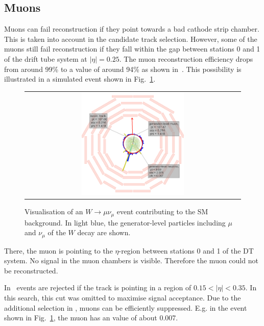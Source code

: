 \subsection*{Muons}
Muons can fail reconstruction if they point towards a bad cathode strip chamber.
This is taken into account in the candidate track selection.
However, some of the muons still fail reconstruction if they fall within the gap between stations 0 and 1 of the drift tube system at $|\eta|=0.25$.
The muon reconstruction efficiency drops from around 99\% to a value of around 94\% as shown in~\cite{bib:CMS:DT_Thesis,bib:CMS:DT_8TeV_AN}.
This possibility is illustrated in a simulated event shown in Fig.~\ref{fig:LostMuon}.
\begin{figure}[!tb]
  \centering 
  \begin{tabular}{c}
    \includegraphics[width=0.49\textwidth]{figures/analysis/Background/LostMuon_Lumi_456307_event_182377157_NEW.png}
  \end{tabular}
  \caption{Visualisation of an $W\rightarrow \mu\nu_{\mu}$ event contributing to the SM background. 
           In light blue, the generator-level particles including $\mu$ and $\nu_{\mu}$ of the $W$ decay are shown.}
  \label{fig:LostMuon}
\end{figure}
There, the muon is pointing to the $\eta$-region between stations 0 and 1 of the DT system.
No signal in the muon chambers is visible. 
Therefore the muon could not be reconstructed.

In~\cite{bib:CMS:DT_Thesis,bib:CMS:DT_8TeV_AN} events are rejected if the track is pointing in a region of $0.15<|\eta|<0.35$.
In this search, this cut was omitted to maximise signal acceptance. 
Due to the additional selection in \ias, muons can be efficiently suppressed.
E.g. in the event shown in Fig.~\ref{fig:LostMuon}, the muon has an \ias value of about 0.007.\\

